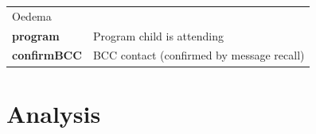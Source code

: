 \documentclass[12pt,a4paper]{book}
\theoremstyle{definition}
\theoremstyle{definition}
\theoremstyle{definition}
\theoremstyle{remark}
\begin{document}
\begin{longtable}[]{@{}ll@{}}
\begin{minipage}[t]{0.41\columnwidth}
Oedema\strut
\end{minipage}\tabularnewline
\begin{minipage}[t]{0.21\columnwidth}\raggedright
\textbf{program}\strut
\end{minipage} & \begin{minipage}[t]{0.41\columnwidth}\raggedright
Program child is attending\strut
\end{minipage}\tabularnewline
\begin{minipage}[t]{0.21\columnwidth}\raggedright
\textbf{confirmBCC}\strut
\end{minipage} & \begin{minipage}[t]{0.41\columnwidth}\raggedright
BCC contact (confirmed by message recall)\strut
\end{minipage}\tabularnewline
\bottomrule
\end{longtable}

\hypertarget{analysis}{%
\chapter{Analysis}\label{analysis}}


\end{document}
